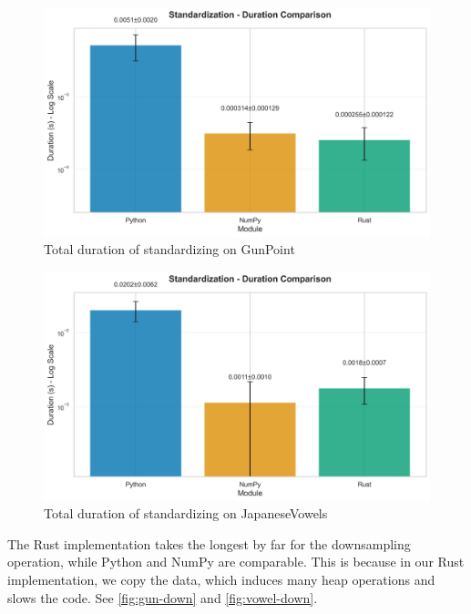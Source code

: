 \documentclass[review]{AIM_report}
\begin{document}
\begin{figure}[H]
    \centering
    \includegraphics[width=\figsize\textwidth]{files/benchmarking/methods_gunpoint/standardization_comparison.png}
    \caption{Total duration of standardizing on GunPoint}
    \label{fig:gun-stand}
\end{figure}
\begin{figure}[H]
    \centering
    \includegraphics[width=\figsize\textwidth]{files/benchmarking/methods_vowels/standardization_comparison.png}
    \caption{Total duration of standardizing on JapaneseVowels}
    \label{fig:vowel-stand}
\end{figure}

The Rust implementation takes the longest by far for the downsampling operation, while Python and NumPy are comparable. This is because in our Rust implementation, we copy the data, which induces many heap operations and slows the code. See \autoref{fig:gun-down} and \autoref{fig:vowel-down}.
\end{document}
